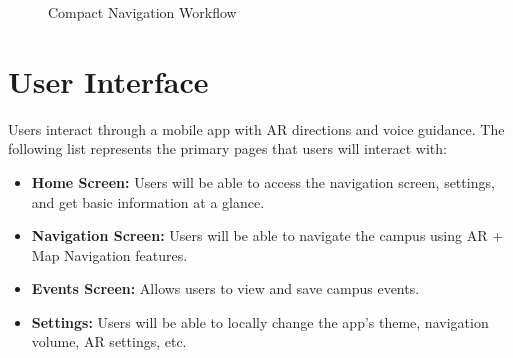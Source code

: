 \documentclass{article}
\begin{document}
\begin{figure}[H]
\centering
{}
    \caption{Compact Navigation Workflow}
	\end{figure}
	\FloatBarrier

\section{User Interface}
Users interact through a mobile app with AR directions and voice guidance. The following list represents the primary pages that users will interact with:

\begin{itemize}
\item \textbf{Home Screen:} Users will be able to access the navigation screen, settings, and get basic information at a glance.
\item \textbf{Navigation Screen:} Users will be able to navigate the campus using AR + Map Navigation features.
\item \textbf{Events Screen:} Allows users to view and save campus events.
\item \textbf{Settings:} Users will be able to locally change the app's theme, navigation volume, AR settings, etc.
\end{itemize}
\end{document}
